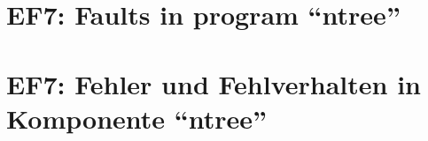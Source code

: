
\thispagestyle{empty}
\ifenglish
\section*{EF7: Faults in program ``ntree''}

\fi
\ifgerman
\section*{EF7: Fehler und Fehlverhalten in Komponente "`ntree"'}

\fi


